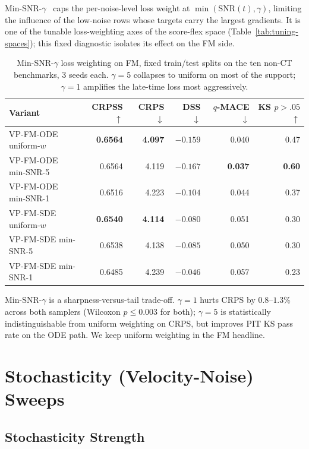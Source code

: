 \documentclass{article}
\begin{document}
Min-SNR-$\gamma$~\citep{hang2023minsnr} caps the per-noise-level loss weight at $\min(\mathrm{SNR}(t),\gamma)$, limiting the influence of the low-noise rows whose targets carry the largest gradients. It is one of the tunable loss-weighting axes of the score-flex space (Table~\ref{tab:tuning-spaces}); this fixed diagnostic isolates its effect on the FM side.

\begin{table}[!h]
  \centering
  \caption{Min-SNR-$\gamma$ loss weighting on FM, fixed train/test splits on the ten non-CT benchmarks, 3 seeds each. $\gamma=5$ collapses to uniform on most of the support; $\gamma=1$ amplifies the late-time loss most aggressively.}\label{tab:minsnr}
  \footnotesize
  \begin{tabular}{lrrrrr}
    \toprule
    Variant & CRPSS $\uparrow$ & CRPS $\downarrow$ & DSS $\downarrow$ & $q$-MACE $\downarrow$ & KS $p{>}.05$ $\uparrow$ \\
    \midrule
    VP-FM-ODE uniform-$w$ & \textbf{0.6564} & \textbf{4.097} & $-0.159$ & 0.040 & 0.47 \\
    VP-FM-ODE min-SNR-5   & 0.6564 & 4.119 & $-0.167$ & \textbf{0.037} & \textbf{0.60} \\
    VP-FM-ODE min-SNR-1   & 0.6516 & 4.223 & $-0.104$ & 0.044 & 0.37 \\
    VP-FM-SDE uniform-$w$ & \textbf{0.6540} & \textbf{4.114} & $-0.080$ & 0.051 & 0.30 \\
    VP-FM-SDE min-SNR-5   & 0.6538 & 4.138 & $-0.085$ & 0.050 & 0.30 \\
    VP-FM-SDE min-SNR-1   & 0.6485 & 4.239 & $-0.046$ & 0.057 & 0.23 \\
    \bottomrule
  \end{tabular}
\end{table}

Min-SNR-$\gamma$ is a sharpness-versus-tail trade-off. $\gamma=1$ hurts CRPS by $0.8$--$1.3\%$ across both samplers (Wilcoxon $p \leq 0.003$ for both); $\gamma=5$ is statistically indistinguishable from uniform weighting on CRPS, but improves PIT KS pass rate on the ODE path. We keep uniform weighting in the FM headline.

\section{Stochasticity (Velocity-Noise) Sweeps}\label{app:stoch}

\subsection{Stochasticity Strength}\label{app:stoch-eps}
\end{document}
